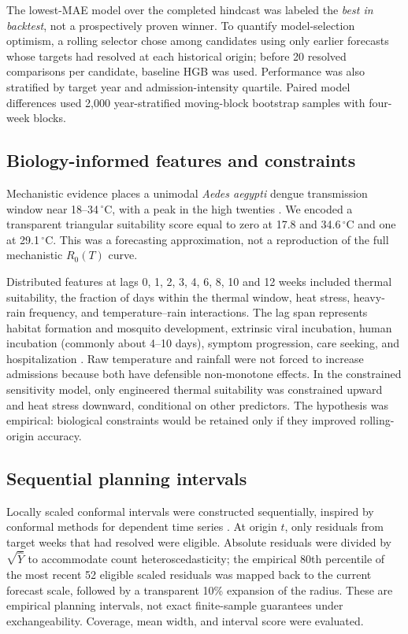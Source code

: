 \documentclass[11pt]{article}
\begin{document}
The lowest-MAE model over the completed hindcast was labeled the \emph{best in backtest}, not a prospectively proven winner. To quantify model-selection optimism, a rolling selector chose among candidates using only earlier forecasts whose targets had resolved at each historical origin; before 20 resolved comparisons per candidate, baseline HGB was used. Performance was also stratified by target year and admission-intensity quartile. Paired model differences used 2,000 year-stratified moving-block bootstrap samples with four-week blocks.

\subsection{Biology-informed features and constraints}

Mechanistic evidence places a unimodal \textit{Aedes aegypti} dengue transmission window near 18--34\,$^\circ$C, with a peak in the high twenties \citep{mordecai2017,ryan2019}. We encoded a transparent triangular suitability score equal to zero at 17.8 and 34.6\,$^\circ$C and one at 29.1\,$^\circ$C. This was a forecasting approximation, not a reproduction of the full mechanistic $R_0(T)$ curve.

Distributed features at lags 0, 1, 2, 3, 4, 6, 8, 10 and 12 weeks included thermal suitability, the fraction of days within the thermal window, heat stress, heavy-rain frequency, and temperature--rain interactions. The lag span represents habitat formation and mosquito development, extrinsic viral incubation, human incubation (commonly about 4--10 days), symptom progression, care seeking, and hospitalization \citep{whoFacts}. Raw temperature and rainfall were not forced to increase admissions because both have defensible non-monotone effects. In the constrained sensitivity model, only engineered thermal suitability was constrained upward and heat stress downward, conditional on other predictors. The hypothesis was empirical: biological constraints would be retained only if they improved rolling-origin accuracy.

\subsection{Sequential planning intervals}

Locally scaled conformal intervals were constructed sequentially, inspired by conformal methods for dependent time series \citep{xu2021}. At origin $t$, only residuals from target weeks that had resolved were eligible. Absolute residuals were divided by $\sqrt{\widehat{Y}}$ to accommodate count heteroscedasticity; the empirical 80th percentile of the most recent 52 eligible scaled residuals was mapped back to the current forecast scale, followed by a transparent 10\% expansion of the radius. These are empirical planning intervals, not exact finite-sample guarantees under exchangeability. Coverage, mean width, and interval score were evaluated.
\end{document}
